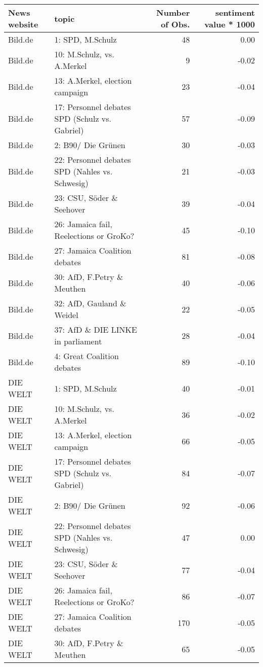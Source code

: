 \begin{table}[ht]
\centering
\begin{tabular}{llrr}
  \hline
News website & topic & Number of Obs. & sentiment value * 1000 \\ 
  \hline
Bild.de & 1: SPD, M.Schulz &  48 & 0.00 \\ 
  Bild.de & 10: M.Schulz, vs. A.Merkel &   9 & -0.02 \\ 
  Bild.de & 13: A.Merkel, election campaign &  23 & -0.04 \\ 
  Bild.de & 17: Personnel debates SPD (Schulz vs. Gabriel) &  57 & -0.09 \\ 
  Bild.de & 2: B90/ Die Grünen &  30 & -0.03 \\ 
  Bild.de & 22: Personnel debates SPD (Nahles vs. Schwesig) &  21 & -0.03 \\ 
  Bild.de & 23: CSU, Söder \& Seehover &  39 & -0.04 \\ 
  Bild.de & 26: Jamaica fail, Reelections or GroKo? &  45 & -0.10 \\ 
  Bild.de & 27: Jamaica Coalition debates &  81 & -0.08 \\ 
  Bild.de & 30: AfD, F.Petry \& Meuthen &  40 & -0.06 \\ 
  Bild.de & 32: AfD, Gauland \& Weidel &  22 & -0.05 \\ 
  Bild.de & 37: AfD \& DIE LINKE in parliament &  28 & -0.04 \\ 
  Bild.de & 4: Great Coalition debates &  89 & -0.10 \\ 
  DIE WELT & 1: SPD, M.Schulz &  40 & -0.01 \\ 
  DIE WELT & 10: M.Schulz, vs. A.Merkel &  36 & -0.02 \\ 
  DIE WELT & 13: A.Merkel, election campaign &  66 & -0.05 \\ 
  DIE WELT & 17: Personnel debates SPD (Schulz vs. Gabriel) &  84 & -0.07 \\ 
  DIE WELT & 2: B90/ Die Grünen &  92 & -0.06 \\ 
  DIE WELT & 22: Personnel debates SPD (Nahles vs. Schwesig) &  47 & 0.00 \\ 
  DIE WELT & 23: CSU, Söder \& Seehover &  77 & -0.04 \\ 
  DIE WELT & 26: Jamaica fail, Reelections or GroKo? &  86 & -0.07 \\ 
  DIE WELT & 27: Jamaica Coalition debates & 170 & -0.05 \\ 
  DIE WELT & 30: AfD, F.Petry \& Meuthen &  65 & -0.05 \\ 

\end{tabular}
\end{table}
